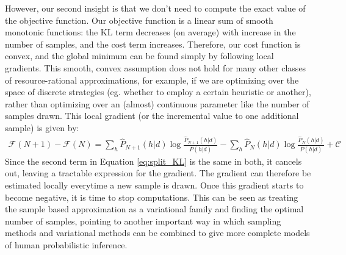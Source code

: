 However, our second insight is that we don't need to compute the exact value of the objective function. Our objective function is a linear sum of smooth monotonic functions: the KL term decreases (on average) with increase in the number of samples, and the cost term increases. Therefore, our cost function is convex, and the global minimum can be found simply by following local gradients. This smooth, convex assumption does not hold for many other classes of resource-rational approximations, for example, if we are optimizing over the space of discrete strategies (eg. whether to employ a certain heuristic or another), rather than optimizing over an (almost) continuous parameter like the number of samples drawn. This local gradient (or the incremental value to one additional sample) is given by:
\begin{align}
\mathcal{F}(N + 1) - \mathcal{F}(N) =  \sum_h \hat{P}_{N+1}(h|d) \log \frac{\hat{P}_{N+1}(h|d)}{P(h|d)} -  \sum_h \hat{P}_N(h|d) \log \frac{\hat{P}_N(h|d)}{P(h|d)} + \mathcal{C}
\end{align}
Since the second term in Equation \ref{eq:split_KL} is the same in both, it cancels out, leaving a tractable expression for the gradient. The gradient can therefore be estimated locally everytime a new sample is drawn. Once this gradient starts to become negative, it is time to stop computations. This can be seen as treating the sample based approximation as a variational family and finding the optimal number of samples\cite{saeedi17}, pointing to another important way in which sampling methods and variational methods can be combined to give more complete models of human probabilistic inference.


%

